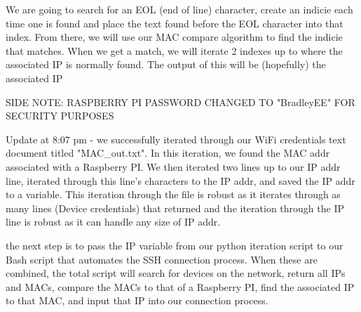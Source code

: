 \documentclass[fontsize=11pt, %
                             paper=letter, %
                             twoside, %
                             captions=tableheading,
                             index=totoc,
                             hyperref]{labbook}
\begin{document}
We are going to search for an EOL (end of line) character, create an indicie each time one is found and place the text found before the EOL character into that index. From there, we will use our MAC compare algorithm to find the indicie that matches. When we get a match, we will iterate 2 indexes up to where the associated IP is normally found. The output of this will be (hopefully) the associated IP 

SIDE NOTE: RASPBERRY PI PASSWORD CHANGED TO "BradleyEE" FOR SECURITY PURPOSES 

Update at 8:07 pm - we successfully iterated through our WiFi credentials text document titled "MAC\_out.txt". In this iteration, we found the MAC addr associated with a Raspberry PI. We then iterated two lines up to our IP addr line, iterated through this line's characters to the IP addr, and saved the IP addr to a variable. This iteration through the file is robust as it iterates through as many lines (Device credentials) that returned and the iteration through the IP line is robust as it can handle any size of IP addr. 

the next step is to pass the IP variable from our python iteration script to our Bash script that automates the SSH connection process. When these are combined, the total script will search for devices on the network, return all IPs and MACs, compare the MACs to that of a Raspberry PI, find the associated IP to that MAC, and input that IP into our connection process. 
\end{document}
